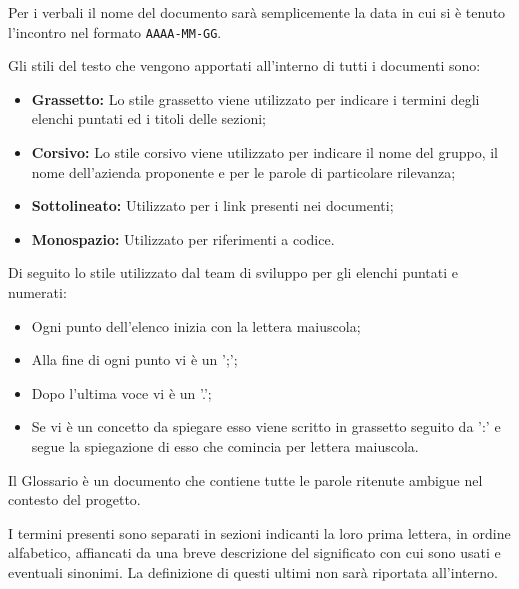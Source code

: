     Per i verbali il nome del documento sarà semplicemente la data in cui si è tenuto l'incontro nel formato \texttt{AAAA-MM-GG}.


    Gli stili del testo che vengono apportati all’interno di tutti i documenti sono:

    \begin{itemize}
      \item \textbf{Grassetto:} Lo stile grassetto viene utilizzato per indicare i termini degli elenchi puntati ed i titoli delle sezioni;
      \item \textbf{Corsivo:} Lo stile corsivo viene utilizzato per indicare il nome del gruppo, il nome dell'azienda proponente e per le parole di particolare rilevanza;
      \item \textbf{Sottolineato:} Utilizzato per i link presenti nei documenti;
      \item \textbf{Monospazio:} Utilizzato per riferimenti a codice.
    \end{itemize}

    \pagebreak


    Di seguito lo stile utilizzato dal team di sviluppo per gli elenchi puntati e numerati:
    \begin{itemize}
      \item Ogni punto dell'elenco inizia con la lettera maiuscola;
      \item Alla fine di ogni punto vi è un ';';
      \item Dopo l'ultima voce vi è un '.';
      \item Se vi è un concetto da spiegare esso viene scritto in grassetto seguito da ':' e segue la spiegazione di esso che comincia per lettera maiuscola.
    \end{itemize}

    Il Glossario è un documento che contiene tutte le parole ritenute ambigue nel contesto del progetto.

    I termini presenti sono separati in sezioni indicanti la loro prima lettera, in ordine alfabetico, affiancati
    da una breve descrizione del significato con cui sono usati e eventuali sinonimi.
    La definizione di questi ultimi non sarà riportata all'interno.

